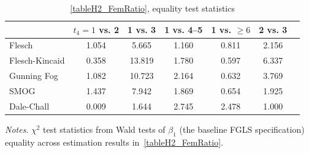 \begin{table}[H]
    \footnotesize
    \centering
    \begin{threeparttable}
        \caption{\autoref{tableH2_FemRatio}, equality test statistics}
        \label{tableH3}
        \begin{tabular}{p{3cm}S@{}S@{}S@{}S@{}S@{}S@{}}
            \toprule
            &{\(t_4=1\) vs. 2}&{1 vs. 3}&{1 vs. 4--5}&{1 vs. \(\ge6\)}&{2 vs. 3}\\
            \midrule
            Flesch              &       1.054&       5.665&       1.160&       0.811&       2.156\\
            Flesch-Kincaid      &       0.358&      13.819&       1.780&       0.597&       6.337\\
            Gunning Fog         &       1.082&      10.723&       2.164&       0.632&       3.769\\
            SMOG                &       1.437&       7.942&       1.869&       0.654&       1.925\\
            Dale-Chall          &       0.009&       1.644&       2.745&       2.478&       1.000\\
            \bottomrule
        \end{tabular}
        \begin{tablenotes}
            \tiny
            \item \textit{Notes}. \(\chi^2\) test statistics from Wald tests of \(\beta_1\) (the baseline FGLS specification) equality across estimation results in~\autoref{tableH2_FemRatio}.
        \end{tablenotes}
    \end{threeparttable}
\end{table}